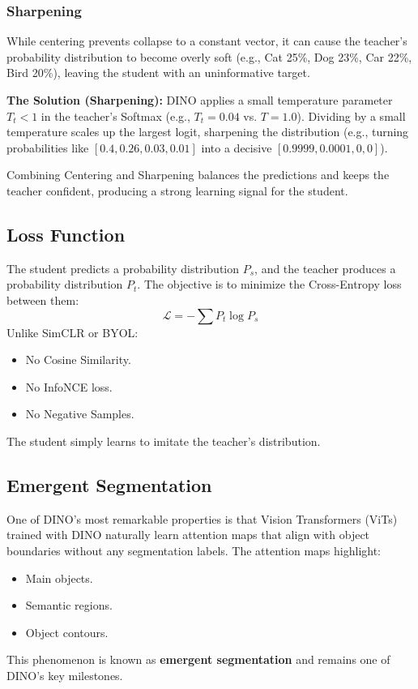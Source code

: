 \subsubsection{Sharpening}

While centering prevents collapse to a constant vector, it can cause the teacher's probability distribution to become overly soft (e.g., Cat 25\%, Dog 23\%, Car 22\%, Bird 20\%), leaving the student with an uninformative target.

\textbf{The Solution (Sharpening):} DINO applies a small temperature parameter $T_t < 1$ in the teacher's Softmax (e.g., $T_t = 0.04$ vs. $T=1.0$). Dividing by a small temperature scales up the largest logit, sharpening the distribution (e.g., turning probabilities like $[0.4, 0.26, 0.03, 0.01]$ into a decisive $[0.9999, 0.0001, 0, 0]$).

Combining Centering and Sharpening balances the predictions and keeps the teacher confident, producing a strong learning signal for the student.

\subsection{Loss Function}

The student predicts a probability distribution $P_s$, and the teacher produces a probability distribution $P_t$. The objective is to minimize the Cross-Entropy loss between them:
\[
\mathcal{L} = - \sum P_t \log P_s
\]
Unlike SimCLR or BYOL:
\begin{itemize}
    \item No Cosine Similarity.
    \item No InfoNCE loss.
    \item No Negative Samples.
\end{itemize}
The student simply learns to imitate the teacher's distribution.

\subsection{Emergent Segmentation}

One of DINO's most remarkable properties is that Vision Transformers (ViTs) trained with DINO naturally learn attention maps that align with object boundaries without any segmentation labels. The attention maps highlight:
\begin{itemize}
    \item Main objects.
    \item Semantic regions.
    \item Object contours.
\end{itemize}
This phenomenon is known as \textbf{emergent segmentation} and remains one of DINO's key milestones.

